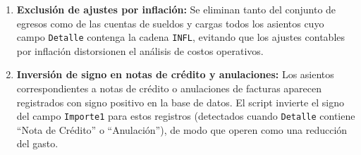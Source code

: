 \documentclass[12pt, a4paper]{article}
\begin{document}
\begin{enumerate}
    \item \textbf{Exclusión de ajustes por inflación:} Se eliminan tanto del conjunto de egresos como de las cuentas de sueldos y cargas todos los asientos cuyo campo \texttt{Detalle} contenga la cadena \texttt{INFL}, evitando que los ajustes contables por inflación distorsionen el análisis de costos operativos.

    \item \textbf{Inversión de signo en notas de crédito y anulaciones:} Los asientos correspondientes a notas de crédito o anulaciones de facturas aparecen registrados con signo positivo en la base de datos. El script invierte el signo del campo \texttt{Importe1} para estos registros (detectados cuando \texttt{Detalle} contiene ``Nota de Crédito'' o ``Anulación''), de modo que operen como una reducción del gasto.
\end{enumerate}
\end{document}
